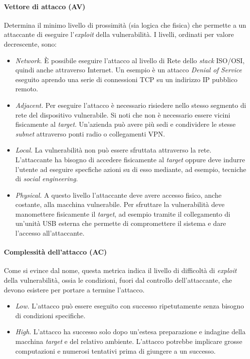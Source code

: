 \documentclass[target=bach,aauheader=]{thud}
\begin{document}
\paragraph{Vettore di attacco (AV)} Determina il minimo livello di prossimità (sia logica che fisica) che permette a un attaccante di eseguire l'\textit{exploit} della vulnerabilità. I livelli, ordinati per valore decrescente, sono:

    \begin{itemize}
        \item \textit{Network.} È possibile eseguire l'attacco al livello di Rete dello \textit{stack} ISO/OSI, quindi anche attraverso Internet. Un esempio è un attacco \textit{Denial of Service} eseguito aprendo una serie di connessioni TCP su un indirizzo IP pubblico remoto.
        \item \textit{Adjacent.} Per eseguire l'attacco è necessario risiedere nello stesso segmento di rete del dispositivo vulnerabile. Si noti che non è necessario essere vicini fisicamente al \textit{target}. Un'azienda può avere più sedi e condividere le stesse \textit{subnet} attraverso ponti radio o collegamenti VPN.
        \item \textit{Local.} La vulnerabilità non può essere sfruttata attraverso la rete. L'attaccante ha bisogno di accedere fisicamente al \textit{target} oppure deve indurre l'utente ad eseguire specfiche azioni su di esso mediante, ad esempio, tecniche di \textit{social engineering}.
        \item \textit{Physical.} A questo livello l'attaccante deve avere accesso fisico, anche costante, alla macchina vulnerabile. Per sfruttare la vulnerabilità deve manomettere fisicamente il \textit{target}, ad esempio tramite il collegamento di un'unità USB esterna che permette di compromettere il sistema e dare l'accesso all'attaccante.
    \end{itemize}

\paragraph{Complessità dell'attacco (AC)} Come si evince dal nome, questa metrica indica il livello di difficoltà di \textit{exploit} della vulnerabilità, ossia le condizioni, fuori dal controllo dell'attaccante, che devono esistere per portare a termine l'attacco.

    \begin{itemize}
        \item \textit{Low.} L'attacco può essere eseguito con successo ripetutamente senza bisogno di condizioni specifiche.
        \item \textit{High.} L'attacco ha successo solo dopo un'estesa preparazione e indagine della macchina \textit{target} e del relativo ambiente. L'attacco potrebbe implicare grosse computazioni e numerosi tentativi prima di giungere a un successo.
    \end{itemize}
\end{document}
